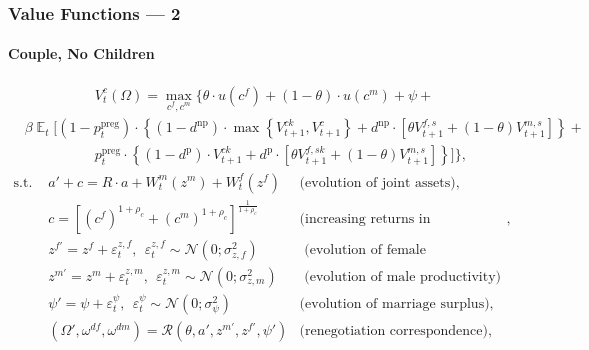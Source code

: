 \documentclass{beamer}
\DeclareMathOperator{\E}{\mathbb{E}}
\begin{document}
\begin{frame}[label=value-functions]
\frametitle{Value Functions --- 2}
\framesubtitle{Couple, No Children}
{\scriptsize
\begin{align}& \hspace{5em}  V^{c}_t(\Omega) = \max\limits_{c^f,c^m}  \bigg\{ \theta\cdot u(c^f) + (1-\theta)\cdot u(c^m) + \psi + \nonumber \\   \nonumber
 &  \beta \E_t \Big[   (1 - p^{\text{preg}}_t)\cdot \left\{ (1-d^{\text{np}})\cdot \max\left\{ V^{ck}_{t+1},V^{c}_{t+1}\right\} + d^{\text{np}}\cdot [ \theta V_{t+1}^{f,s} + (1-\theta)V_{t+1}^{m,s}]\right\}  +  \\  \nonumber
& \hspace{5em} p^{\text{preg}}_t\cdot \left\{ (1-d^{\text{p}})\cdot V^{ck}_{t+1} + d^{\text{p}}\cdot [ \theta V_{t+1}^{f,sk} + (1-\theta)V_{t+1}^{m,s}]\right\} \Big] \bigg\},
\end{align}\vspace{-2em}
\begin{align*}
\text{s.t. \ }& a' + c = R\cdot a  + W^m_t(z^m) + W^f_t(z^f) & \text{(evolution of joint assets)},\\
				 & c = [(c^f)^{1+\rho_c} + (c^m)^{1+\rho_c}]^{\frac1{1+\rho_c}} & \text{(increasing returns in consumption)},\\
				 &  z^{f\prime} = z^f + \varepsilon^{z,f}_t, \ \ \varepsilon^{z,f}_t \sim \mathcal{N}(0;\sigma_{z,f}^2) &  \text{ (evolution of female productivity)}\\
				 &  z^{m\prime} = z^m + \varepsilon^{z,m}_t, \ \ \varepsilon^{z,m}_t \sim \mathcal{N}(0;\sigma_{z,m}^2) &  \text{ (evolution of male productivity)}\\
                    & \psi' = \psi + \varepsilon^{\psi}_t, \ \ \varepsilon^{\psi}_t \sim \mathcal{N}(0;\sigma_{\psi}^2)  & \text{(evolution of marriage surplus),} \\
                    & (\Omega',\omega^{df},\omega^{dm}) = \mathcal{R}(\theta,a',z^{m\prime},z^{f\prime},\psi') & \text{(renegotiation correspondence)},
\end{align*}
}
\hyperlink{utilities}{}
\end{frame}
\end{document}
